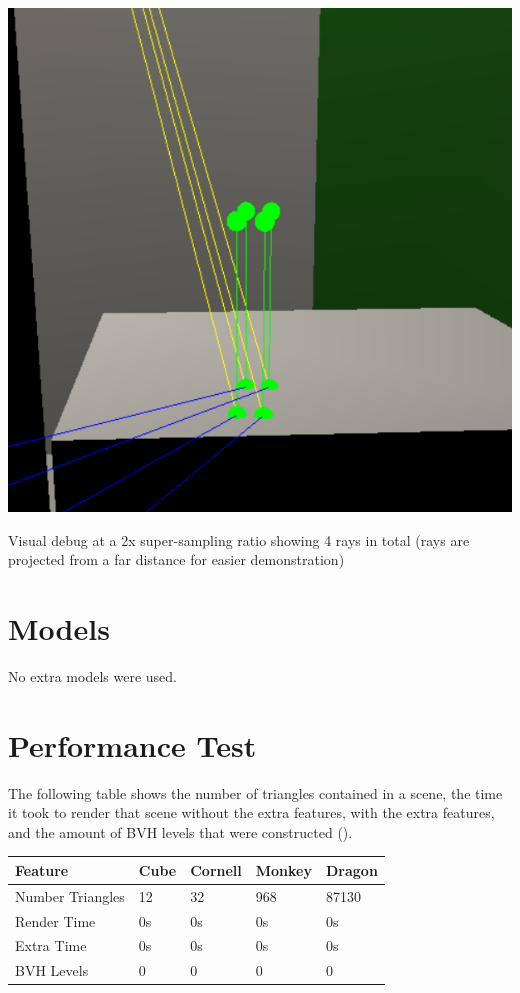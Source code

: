 \documentclass{article}
\begin{document}
    \begin{center}
      \includegraphics[scale=0.75]{images/supersampling_debugger.png}

      Visual debug at a 2x super-sampling ratio showing 4 rays in total (rays are projected from a far 
      distance for easier demonstration)
    \end{center}

    \newpage

    \section{Models}
    No extra models were used.

    \section{Performance Test}
    The following table shows the number of triangles contained in a scene, the time it took to render that 
    scene without the extra features, with the extra features, and the amount of BVH levels that were 
    constructed ().
    
    \vspace{5mm}
    
    \noindent\begin{tabular}{ |p{2.8cm}||p{1.6cm}|p{1.6cm}|p{1.6cm}|p{1.6cm}| }
      \hline
      \textbf{Feature} &\textbf{Cube} &\textbf{Cornell} &\textbf{Monkey} &\textbf{Dragon}\\
      \hline
      Number Triangles  &12     &32     &968    &87130\\
      Render Time       &0s     &0s     &0s     &0s\\
      Extra Time        &0s     &0s     &0s     &0s\\
      BVH Levels        &0      &0      &0      &0\\
      \hline
    \end{tabular}
\end{document}
